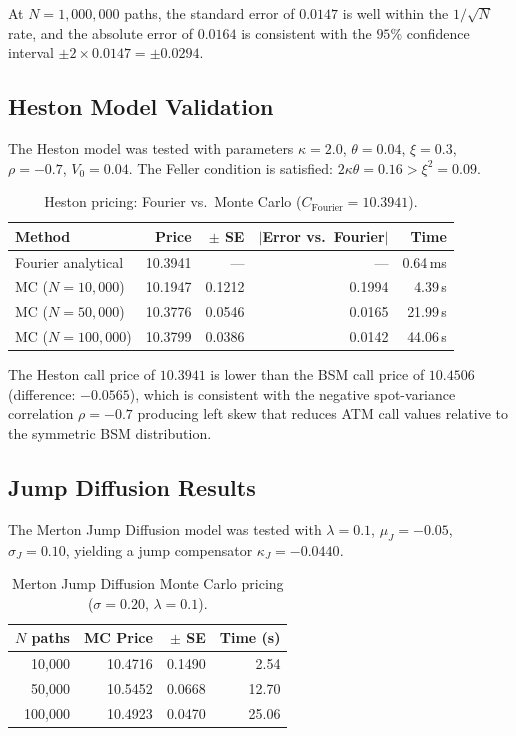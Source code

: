 \documentclass[12pt,a4paper]{article}
\begin{document}
At $N = 1{,}000{,}000$ paths, the standard error of $0.0147$ is well within the $1/\sqrt{N}$ rate, and the absolute error of $0.0164$ is consistent with the $95\%$ confidence interval $\pm 2 \times 0.0147 = \pm 0.0294$.

\subsection{Heston Model Validation}

The Heston model was tested with parameters $\kappa = 2.0$, $\theta = 0.04$, $\xi = 0.3$, $\rho = -0.7$, $V_0 = 0.04$. The Feller condition is satisfied: $2\kappa\theta = 0.16 > \xi^2 = 0.09$.

\begin{table}[H]
\centering
\caption{Heston pricing: Fourier vs.\ Monte Carlo ($C_{\text{Fourier}} = 10.3941$).}
\label{tab:heston}
\begin{tabular}{@{}lrrrr@{}}
\toprule
Method & Price & $\pm$ SE & $|$Error vs.\ Fourier$|$ & Time \\
\midrule
Fourier analytical & 10.3941 & --- & --- & 0.64\,ms \\
MC ($N=10{,}000$)  & 10.1947 & 0.1212 & 0.1994 & 4.39\,s \\
MC ($N=50{,}000$)  & 10.3776 & 0.0546 & 0.0165 & 21.99\,s \\
MC ($N=100{,}000$) & 10.3799 & 0.0386 & 0.0142 & 44.06\,s \\
\bottomrule
\end{tabular}
\end{table}

The Heston call price of $10.3941$ is lower than the BSM call price of $10.4506$ (difference: $-0.0565$), which is consistent with the negative spot-variance correlation $\rho = -0.7$ producing left skew that reduces ATM call values relative to the symmetric BSM distribution.

\subsection{Jump Diffusion Results}

The Merton Jump Diffusion model was tested with $\lambda = 0.1$, $\mu_J = -0.05$, $\sigma_J = 0.10$, yielding a jump compensator $\kappa_J = -0.0440$.

\begin{table}[H]
\centering
\caption{Merton Jump Diffusion Monte Carlo pricing ($\sigma = 0.20$, $\lambda = 0.1$).}
\label{tab:jd}
\begin{tabular}{@{}rrrr@{}}
\toprule
$N$ paths & MC Price & $\pm$ SE & Time (s) \\
\midrule
10{,}000  & 10.4716 & 0.1490 & 2.54 \\
50{,}000  & 10.5452 & 0.0668 & 12.70 \\
100{,}000 & 10.4923 & 0.0470 & 25.06 \\
\bottomrule
\end{tabular}
\end{table}
\end{document}
